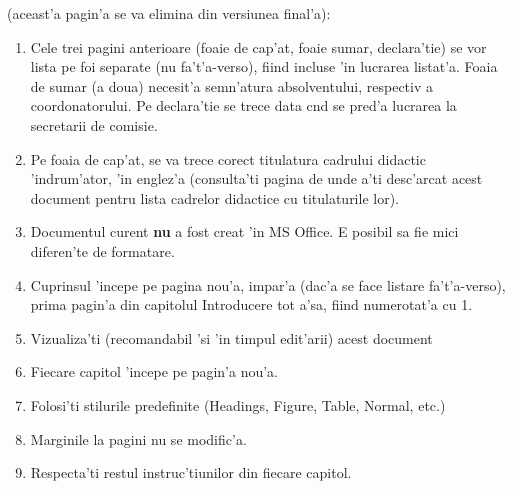{\color{red}{\bf De citit 'inainte} (aceast'a pagin'a se va elimina din versiunea final'a)}:
\begin{enumerate}
 \item Cele trei pagini anterioare (foaie de cap'at, foaie sumar, declara'tie) se vor lista pe foi separate (nu fa't'a-verso), fiind incluse 'in lucrarea listat'a. 
 Foaia de sumar (a doua) necesit'a semn'atura absolventului, respectiv a coordonatorului.
 Pe declara'tie se trece data c\ia nd se pred'a lucrarea la secretarii de comisie.
 \item Pe foaia de cap'at, se va trece corect titulatura cadrului didactic 'indrum'ator, 'in englez'a (consulta'ti pagina de unde a'ti desc'arcat acest document pentru lista cadrelor didactice cu titulaturile lor).
 \item Documentul curent {\bf nu} a fost creat 'in MS Office. E posibil sa fie mici diferen'te de formatare. 
\item Cuprinsul 'incepe pe pagina nou'a, impar'a (dac'a se face listare fa't'a-verso), prima pagin'a din capitolul Introducere tot a'sa, fiind numerotat'a cu 1. %
\item Vizualiza'ti (recomandabil 'si 'in timpul edit'arii) acest document %
\item Fiecare capitol 'incepe pe pagin'a nou'a. %
\item Folosi'ti stilurile predefinite (Headings, Figure, Table, Normal, etc.)
\item Marginile la pagini nu se modific'a.
\item Respecta'ti restul instruc'tiunilor din fiecare capitol.
\end{enumerate}
